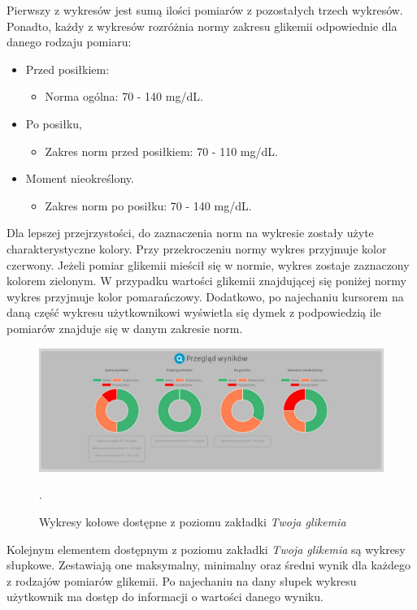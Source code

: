 Pierwszy z wykresów jest sumą ilości pomiarów z pozostałych trzech wykresów. Ponadto, każdy z wykresów rozróżnia normy zakresu glikemii odpowiednie dla danego rodzaju pomiaru:

\begin{itemize}
	\item Przed posiłkiem:
	\begin{itemize}
		\item Norma ogólna: 70 - 140 mg/dL.
	\end{itemize}
	\item Po posiłku,
	\begin{itemize}
		\item Zakres norm przed posiłkiem: 70 - 110 mg/dL.
	\end{itemize}
	\item Moment nieokreślony.
	\begin{itemize}
		\item Zakres norm po posiłku: 70 - 140 mg/dL.
	\end{itemize}
\end{itemize}

Dla lepszej przejrzystości, do zaznaczenia norm na wykresie zostały użyte charakterystyczne kolory. Przy przekroczeniu normy wykres przyjmuje kolor czerwony. Jeżeli pomiar glikemii mieścił się w normie, wykres zostaje zaznaczony kolorem zielonym. W przypadku wartości glikemii znajdującej się poniżej normy wykres przyjmuje kolor pomarańczowy. Dodatkowo, po najechaniu kursorem na daną część wykresu użytkownikowi wyświetla się dymek z podpowiedzią ile pomiarów znajduje się w danym zakresie norm. 

\begin{figure}[h]
	\centering\includegraphics[scale=0.35]{images/bar_charts.jpg}
	\caption{Wykresy kołowe dostępne z poziomu zakładki \textit{Twoja glikemia}}.
	\label{Rys:barChart}
\end{figure}

Kolejnym elementem dostępnym z poziomu zakładki \textit{Twoja glikemia} są wykresy słupkowe. Zestawiają one maksymalny, minimalny oraz średni wynik dla każdego z rodzajów pomiarów glikemii. Po najechaniu na dany słupek wykresu użytkownik ma dostęp do informacji o wartości danego wyniku. 

